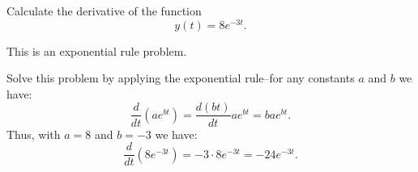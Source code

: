 \documentclass{ximera}
\author{Emma Smith Zbarsky}
\begin{document}
\begin{exercise}

Calculate the derivative of the function \[y(t) = 8e^{-3t}.\]


\begin{hint}
This is an exponential rule problem.
\end{hint}


\begin{hint}
Solve this problem by applying the exponential rule--for any constants
$a$ and $b$ we have:
\[\frac{d}{dt}\left(ae^{bt}\right) = \frac{d(bt)}{dt}ae^{bt} = bae^{bt}.\]
Thus, with $a=8$ and $b=-3$ we have:
\[\frac{d}{dt}\left(8e^{-3t}\right) = -3\cdot 8 e^{-3t} = \boxed{-24e^{-3t}}.\]
\end{hint}


\begin{multipleChoice}
\end{multipleChoice}

\end{exercise}
\end{document}
